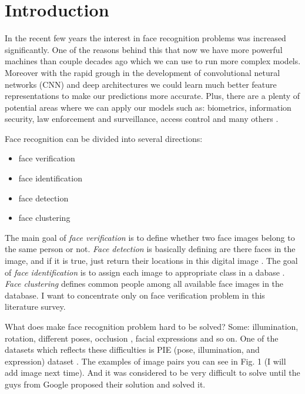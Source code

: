 \documentclass[paper=a4, fontsize=11pt]{scrartcl} %
\numberwithin{equation}{section} %
\numberwithin{figure}{section} %
\numberwithin{table}{section} %
\begin{document}

\newpage

\section{Introduction}

In the recent few years the interest in face recognition problems was increased significantly. One of the reasons behind this that now we have more powerful machines than couple decades ago which we can use to run more complex models. Moreover with the rapid grough in the development of convolutional netural networks (CNN) and deep architectures we could learn much better feature representations to make our predictions more accurate. Plus, there are a plenty of potential areas where we can apply our models such as: biometrics, information security, law enforcement and surveillance, access control and many others \cite{zhao2003face}. \par
Face recognition can be divided into several directions:
\begin{itemize}
  \item face verification
  \item face identification
  \item face detection
  \item face clustering
\end{itemize}

The main goal of \textit{face verification} is to define whether two face images belong to the same person or not. \textit{Face detection} is basically defining are there faces in the image, and if it is true, just return their locations in this digital image \cite{yang2002detecting}. The goal of \textit{face identification} is to assign each image to appropriate class in a dabase \cite{seo2011face}. \textit{Face clustering} defines common people among all available face images in the database. I want to concentrate only on face verification problem in this literature survey. \par

What does make face recognition problem hard to be solved? Some: illumination, rotation, different poses, occlusion \cite{ekenel2009facial}, facial expressions and so on. One of the datasets which reflects these difficulties is PIE (pose, illumination, and expression) dataset \cite{sim2002cmu}. The examples of image pairs you can see in Fig. 1 (I will add image next time). And it was considered to be very difficult to solve until the guys from Google proposed their solution \cite{schroff2015facenet} and solved it.
\end{document}
